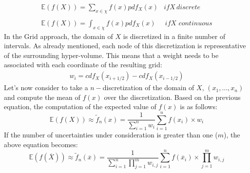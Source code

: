\begin{equation}
\begin{matrix}
\mathbb{E}(f(X)) =\sum_{x \in \chi} f(x)pdf_{X}(x) & if X \, discrete \\ 
\\ 
\mathbb{E}(f(X)) =\int_{x \in \chi} f(x)pdf_{X}(x) & \, if X \, \, continuous
\end{matrix}
\end{equation}
In the Grid approach, the domain of $X$ is discretized in a finite number of intervals. As already mentioned,
each node of this discretization is representative of the surrounding hyper-volume. This means that a weight 
needs to be associated with each coordinate of the resulting grid:
\begin{equation}
\begin{matrix}
  w_{i}= cdf_{X}(x_{i+1/2}) - cdf_{X}(x_{i-1/2})
\end{matrix}  
\end{equation}
Let's now consider 
to take a $n-$discretization of the domain of  $X$, $(x_{1},...,x_{n})$ and compute the mean of $f(x)$ over the discretization. Based on the previous equation, the computation of the expected value of $f(x)$ is as follows:
\begin{equation}
 \mathbb{E}(f(X)) \approx   \widetilde{f}_{n}(x) = \frac{1}{\sum_{i=1}^{n}w_{i}} \sum_{i=1}^{n} f(x_{i}) \times w_{i}
\end{equation}
If the number of uncertainties under consideration is greater than one ($m$), the above equation
becomes:
\begin{equation}
\mathbb{E}(f(\overline{X})) \approx   \widetilde{f}_{n}(\overline{x}) = \frac{1}{\sum_{i=1}^{n}\prod_{j=1}^{m}w_{i,j}} \sum_{i=1}^{n} f(\overline{x}_{i}) \times \prod_{j=1}^{m}w_{i,j}
\end{equation}

